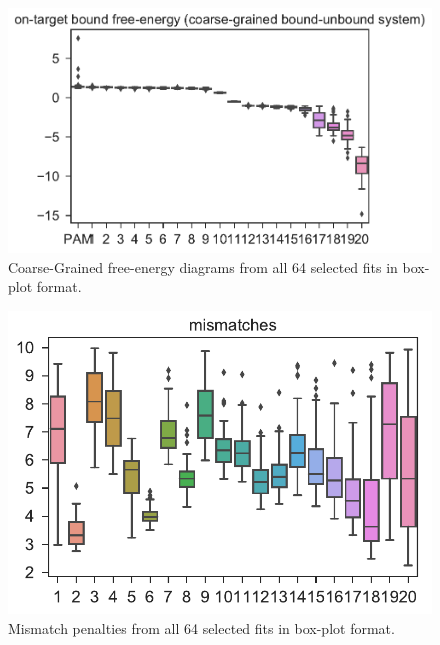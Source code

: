 \documentclass[a4paper,twoside]{revtex4-1}
\begin{document}
\begin{figure}[H]
\centering
\includegraphics[scale=0.5]{fig2_15_11_2018.pdf}
\caption{Coarse-Grained free-energy diagrams from all 64 selected fits in box-plot format.}
\end{figure}

\begin{figure}[H]
\centering
\includegraphics[scale=0.5]{fig3_15_11_2018.pdf}
\caption{Mismatch penalties from all 64 selected fits in box-plot format.}
\end{figure}
\end{document}
